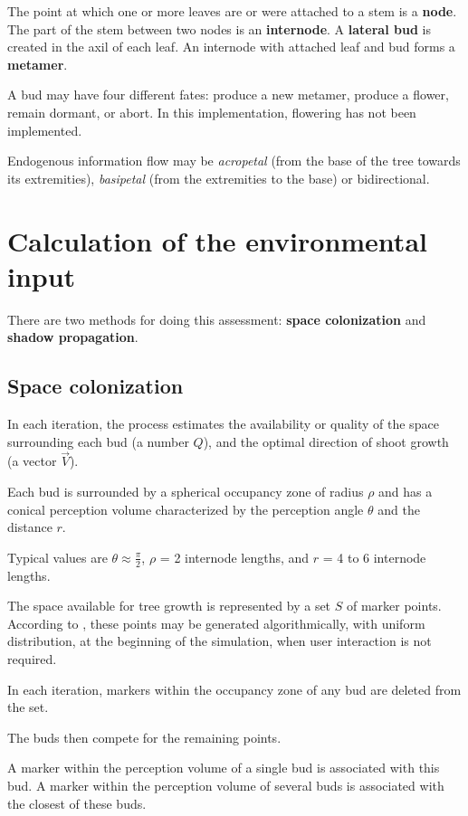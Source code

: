 \documentclass{article}
\begin{document}
The point at which one or more leaves are or were attached to a stem is a \textbf{node}.
The part of the stem between two nodes is an \textbf{internode}.
A \textbf{lateral bud} is created in the axil of each leaf.
An internode with attached leaf and bud forms a \textbf{metamer}.

A bud may have four different fates: produce a new metamer, produce a flower, remain dormant, or abort.
In this implementation, flowering has not been implemented.

Endogenous information flow may be \textit{acropetal} (from the base of the tree towards its extremities), \textit{basipetal} (from the extremities to the base) or bidirectional.

\section{Calculation of the environmental input}

There are two methods for doing this assessment: \textbf{space colonization} and \textbf{shadow propagation}.

\subsection{Space colonization}

In each iteration, the process estimates the availability or quality of the space surrounding each bud (a number \(Q\)), and the optimal direction of shoot growth (a vector \(\vec{V}\)).

Each bud is surrounded by a spherical occupancy zone of radius \(\rho\) and has a conical perception volume characterized by the perception angle \(\theta\) and the distance \(r\).

Typical values are \(\theta \approx \frac{\pi}{2}\), \(\rho\) = 2 internode lengths, and \(r\) = 4 to 6 internode lengths.

The space available for tree growth is represented by a set \(S\) of marker points.
According to \cite[p. 3]{Palubicki2009}, these points may be generated algorithmically, with uniform distribution, at the beginning of the simulation, when user interaction is not required.

In each iteration, markers within the occupancy zone of any bud are deleted from the set.

The buds then compete for the remaining points.

A marker within the perception volume of a single bud is associated with this bud. A marker within the perception volume of several buds is associated with the closest of these buds.
\end{document}

